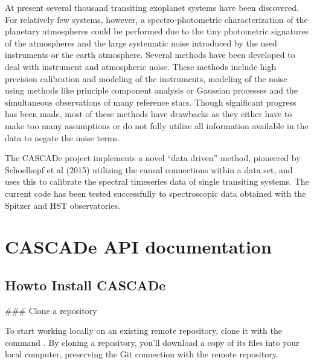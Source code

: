 \documentclass[a4paper,10pt,english]{sphinxmanual}
\begin{document}
        \clearpage
        \tableofcontents
        \listoffigures
        \listoftables
        \clearpage

        
\pagestyle{plain}
 
\pagestyle{normal}
\label{\detokenize{index::doc}}


At present several thousand transiting exoplanet systems have been discovered.
For relatively few systems, however, a spectro-photometric characterization of
the planetary atmospheres could be performed due to the tiny photometric signatures
of the atmospheres and the large systematic noise introduced by the used instruments
or the earth atmosphere. Several methods have been developed to deal with instrument
and atmospheric noise. These methods include high precision calibration and modeling
of the instruments, modeling of the noise using methods like principle component
analysis or Gaussian processes and the simultaneous observations of many reference
stars. Though significant progress has been made, most of these methods have drawbacks
as they either have to make too many assumptions or do not fully utilize all
information available in the data to negate the noise terms.

The CASCADe project implements a novel “data driven” method, pioneered by
Schoelkopf et al (2015) utilizing the causal connections within a data set,
and uses this to calibrate the spectral timeseries data of single transiting
systems. The current code has been tested successfully to spectroscopic data
obtained with the Spitzer and HST observatories.


\chapter{CASCADe API documentation}
\label{\detokenize{index:cascade-api-documentation}}

\section{Howto Install CASCADe}
\label{\detokenize{install:howto-install-cascade}}\label{\detokenize{install::doc}}
\#\#\# Clone a repository

To start working locally on an existing remote repository,
clone it with the command .
By cloning a repository, you’ll download a copy of its
files into your local computer, preserving the Git
connection with the remote repository.
\end{document}
